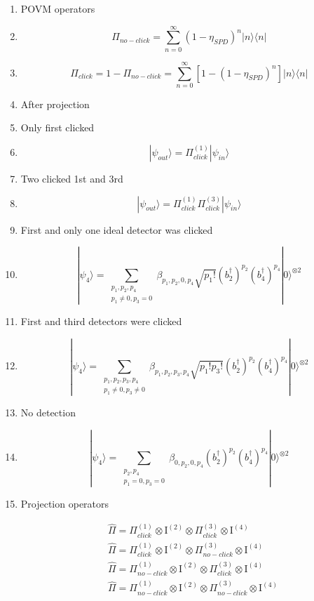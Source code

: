 \documentclass[12pt]{article}
\begin{document}
\begin{enumerate}
\item POVM operators
\item $$ \Pi_{no-click} = \sum_{n=0}^{\infty} (1-\eta_{SPD})^n  |n\rangle  \langle n| $$
\item $$ \Pi_{click} = 1 - \Pi_{no-click} = \sum_{n=0}^{\infty}[1 - (1-\eta_{SPD})^n]  |n\rangle  \langle n| $$


\item After projection

\item Only first clicked
\item $$ |\psi_{out}\rangle = \Pi_{click}^{(1)} |\psi_{in}\rangle $$

\item Two clicked 1st and 3rd
\item $$ |\psi_{out}\rangle = \Pi_{click}^{(1)}\Pi_{click}^{(3)}  |\psi_{in}\rangle $$



\item First and only one ideal detector was clicked

\item $$ |\psi_4\rangle = \sum_{\substack{p_{1},p_{2},p_{4} \\ p_{1} \neq 0, p_{3}=0}} \beta_{p_{1},p_{2},0,p_{4}} \sqrt{p_{1}!} (b_{2}^{\dag})^{p_{2}} (b_{4}^{\dag})^{p_{4}}  |0\rangle^{\otimes 2} $$

\item First and third detectors were clicked

\item $$ |\psi_4\rangle = \sum_{\substack{p_{1},p_{2},p_{3},p_{4} \\ p_{1} \neq 0, p_{3} \neq 0}} \beta_{p_{1},p_{2},p_{3},p_{4}} \sqrt{p_{1}!p_{3}!} (b_{2}^{\dag})^{p_{2}} (b_{4}^{\dag})^{p_{4}} |0\rangle^{\otimes 2} $$

\item No detection

\item $$ |\psi_4\rangle = \sum_{\substack{p_{2},p_{4} \\ p_{1}=0, p_{3}=0}} \beta_{0,p_{2},0,p_{4}} (b_{2}^{\dag})^{p_{2}} (b_{4}^{\dag})^{p_{4}} |0\rangle^{\otimes 2} $$

\item Projection operators



\begin{align*} 
&  \hat{\Pi} = \Pi_{click}^{(1)} \otimes  \textrm{I}^{(2)}  \otimes  \Pi_{click}^{(3)} \otimes  \textrm{I}^{(4)}   \\
&  \hat{\Pi} = \Pi_{click}^{(1)} \otimes  \textrm{I}^{(2)}  \otimes  \Pi_{no-click}^{(3)} \otimes  \textrm{I}^{(4)}  \\ 
&  \hat{\Pi} = \Pi_{no-click}^{(1)} \otimes  \textrm{I}^{(2)}  \otimes  \Pi_{click}^{(3)} \otimes  \textrm{I}^{(4)} \\
&    \hat{\Pi} = \Pi_{no-click}^{(1)} \otimes  \textrm{I}^{(2)}  \otimes  \Pi_{no-click}^{(3)} \otimes  \textrm{I}^{(4)}  
\end{align*}


\end{enumerate}
\end{document}
